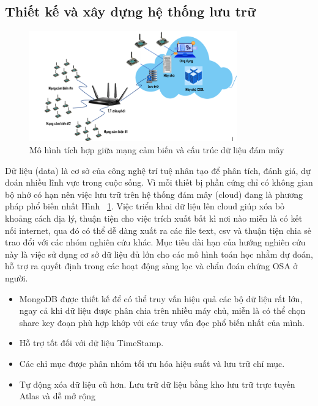 \subsection{Thiết kế và xây dựng hệ thống lưu trữ   }
\begin{figure}[b!]
		\centering
 		\includegraphics[width=0.8\textwidth]{images/cloud.png}
		\caption{Mô hình tích hợp giữa mạng cảm biến và cấu trúc dữ liệu đám mây}
		\label{cloud}
\end{figure}


Dữ liệu (data) là cơ sở của công nghệ trí tuệ nhân tạo để phân tích, đánh giá, dự đoán nhiều lĩnh vực trong cuộc sống. Vì mỗi thiết bị phần cứng chỉ có không gian bộ nhớ có hạn nên việc lưu trữ trên hệ thống đám mây (cloud) đang là phương pháp phổ biến nhất Hình ~\ref{cloud}. Việc triển khai dữ liệu lên cloud giúp xóa bỏ khoảng cách địa lý, thuận tiện cho việc trích xuất bất kì nơi nào miễn là có kết nối internet, qua đó có thể dễ dàng xuất ra các file text, csv và thuận tiện chia sẻ trao đổi với các nhóm nghiên cứu khác. Mục tiêu dài hạn của hướng nghiên cứu này là việc sử dụng cơ sở dữ liệu đủ lớn cho các mô hình toán học nhằm dự đoán, hỗ trợ ra quyết định trong các hoạt động sàng lọc và chẩn đoán chứng \gls{OSA} ở người. 


\begin{itemize}
    \item MongoDB được thiết kế để có thể truy vấn hiệu quả các bộ dữ liệu rất lớn, ngay cả khi dữ liệu được phân chia trên nhiều máy chủ, miễn là có thể chọn share key đoạn phù hợp khớp với các truy vấn đọc phổ biến nhất của mình.
    
    \item Hỗ trợ tốt đối với dữ liệu TimeStamp.
    
    \item Các chỉ mục được phân nhóm tối ưu hóa hiệu suất và lưu trữ chỉ mục.
    
    \item Tự động xóa dữ liệu cũ hơn. Lưu trữ dữ liệu bằng kho lưu trữ trực tuyến Atlas và dễ mở rộng
\end{itemize}


